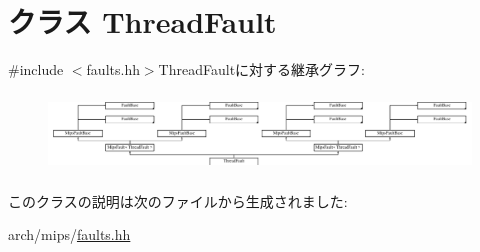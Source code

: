 \hypertarget{classMipsISA_1_1ThreadFault}{
\section{クラス ThreadFault}
\label{classMipsISA_1_1ThreadFault}
}


{\ttfamily \#include $<$faults.hh$>$}ThreadFaultに対する継承グラフ:\begin{figure}[H]
\begin{center}
\leavevmode
\includegraphics[height=2.09581cm]{classMipsISA_1_1ThreadFault}
\end{center}
\end{figure}


このクラスの説明は次のファイルから生成されました:\begin{DoxyCompactItemize}
\item 
arch/mips/\hyperlink{arch_2mips_2faults_8hh}{faults.hh}\end{DoxyCompactItemize}
